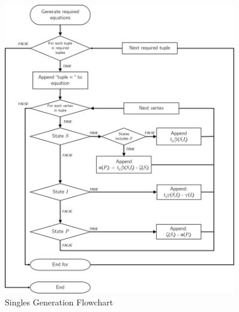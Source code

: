 \documentclass[12pt,a4paper]{article}
\begin{document}
\begin{figure}[!ht]
\centering
     \includegraphics[width=0.9\textwidth]{Equations/GenerateEquations}
         \caption{Singles Generation Flowchart}
         \label{fig:gen-singles}
\end{figure}


\newpage


\end{document}
